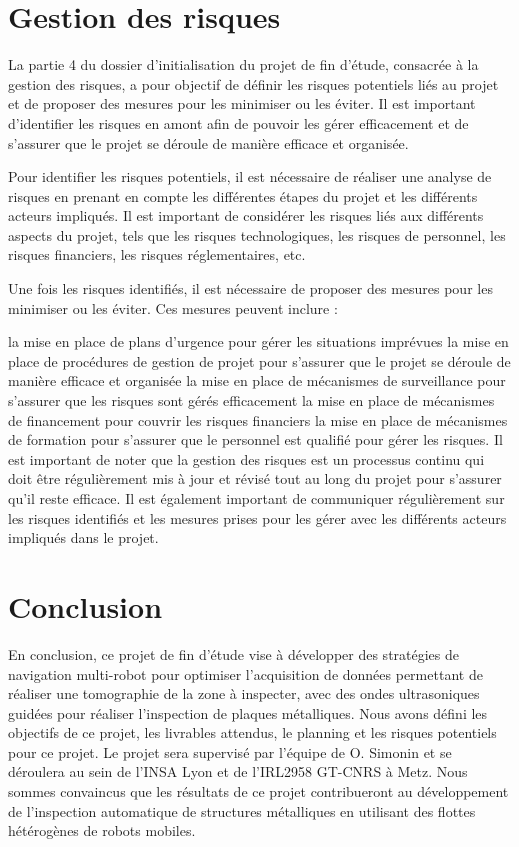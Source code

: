 \documentclass[init,francais,RandD]{rapportPFE}  %
\begin{document}
	\section{Gestion des risques}
		La partie 4 du dossier d'initialisation du projet de fin d'étude, consacrée à la gestion des risques, a pour objectif de définir les risques potentiels liés au projet et de proposer des mesures pour les minimiser ou les éviter. Il est important d'identifier les risques en amont afin de pouvoir les gérer efficacement et de s'assurer que le projet se déroule de manière efficace et organisée.

		Pour identifier les risques potentiels, il est nécessaire de réaliser une analyse de risques en prenant en compte les différentes étapes du projet et les différents acteurs impliqués. Il est important de considérer les risques liés aux différents aspects du projet, tels que les risques technologiques, les risques de personnel, les risques financiers, les risques réglementaires, etc.

		Une fois les risques identifiés, il est nécessaire de proposer des mesures pour les minimiser ou les éviter. Ces mesures peuvent inclure :

		la mise en place de plans d'urgence pour gérer les situations imprévues
		la mise en place de procédures de gestion de projet pour s'assurer que le projet se déroule de manière efficace et organisée
		la mise en place de mécanismes de surveillance pour s'assurer que les risques sont gérés efficacement
		la mise en place de mécanismes de financement pour couvrir les risques financiers
		la mise en place de mécanismes de formation pour s'assurer que le personnel est qualifié pour gérer les risques.
		Il est important de noter que la gestion des risques est un processus continu qui doit être régulièrement mis à jour et révisé tout au long du projet pour s'assurer qu'il reste efficace. Il est également important de communiquer régulièrement sur les risques identifiés et les mesures prises pour les gérer avec les différents acteurs impliqués dans le projet.
	\section{Conclusion}
		En conclusion, ce projet de fin d'étude vise à développer des stratégies de navigation multi-robot pour optimiser l'acquisition de données permettant de réaliser une tomographie de la zone à inspecter, avec des ondes ultrasoniques guidées pour réaliser l'inspection de plaques métalliques. Nous avons défini les objectifs de ce projet, les livrables attendus, le planning et les risques potentiels pour ce projet. Le projet sera supervisé par l'équipe de O. Simonin et se déroulera au sein de l'INSA Lyon et de l'IRL2958 GT-CNRS à Metz. Nous sommes convaincus que les résultats de ce projet contribueront au développement de l'inspection automatique de structures métalliques en utilisant des flottes hétérogènes de robots mobiles.
	
	
\end{document}
